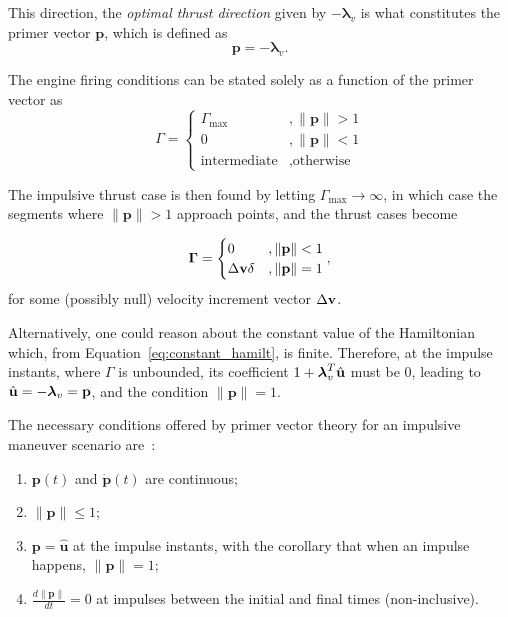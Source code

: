 This direction, the \textit{optimal thrust direction} given by \(-\boldsymbol{\lambda}_v\) is what constitutes the primer vector \(\mathbf{p}\), which is defined as 
\begin{equation}\label{eq:p_lambda_v_cons}
    \mathbf{p} = -\boldsymbol{\lambda}_v.
\end{equation}

The engine firing conditions can be stated solely as a function of the primer vector as~\cite{Conway_2010}
\begin{equation}
    \Gamma = \begin{cases}
        \Gamma_{\max}&, \lVert \mathbf{p} \rVert > 1 \\
        0&, \lVert \mathbf{p} \rVert < 1 \\
        \text{intermediate}&, \text{otherwise}
    \end{cases}
\end{equation}

The impulsive thrust case is then found by letting \(\Gamma_{\max} \rightarrow \infty\), in which case the segments where \(\lVert \mathbf{p} \rVert > 1\) approach points, and the thrust cases become

\begin{equation}
    \mathbf{\Gamma} = \begin{cases}
        0&, \lVert \mathbf{p} \rVert < 1 \\
        \Delta \mathbf{v} \delta&, \lVert \mathbf{p} \rVert = 1 \\
    \end{cases},
\end{equation}
for some (possibly null) velocity increment vector \(\Delta \mathbf{v}\).

Alternatively, one could reason about the constant value of the Hamiltonian which, from Equation~\eqref{eq:constant_hamilt}, is finite. Therefore, at the impulse instants, where \(\Gamma\) is unbounded, its coefficient \(1 + \boldsymbol{\lambda}_v^T \hat{\mathbf{u}}\) must be \(0\), leading to \(\hat{\mathbf{u}} = -\boldsymbol{\lambda}_v = \mathbf{p}\), and the condition \(\lVert \mathbf{p} \rVert = 1\).

The necessary conditions offered by primer vector theory for an impulsive maneuver scenario are~\cite{Conway_2010}:
\begin{enumerate}
    \item \(\mathbf{p}(t)\) and \(\dot{\mathbf{p}}(t)\) are continuous;
    \item \(\lVert \mathbf{p} \rVert \leq 1\);
    \item \(\mathbf{p} = \hat{\mathbf{u}}\) at the impulse instants, with the corollary that when an impulse happens, \(\lVert \mathbf{p} \rVert = 1\);
    \item \(\frac{d \lVert \mathbf{p} \rVert}{dt} = 0\) at impulses between the initial and final times (non-inclusive).
\end{enumerate}

